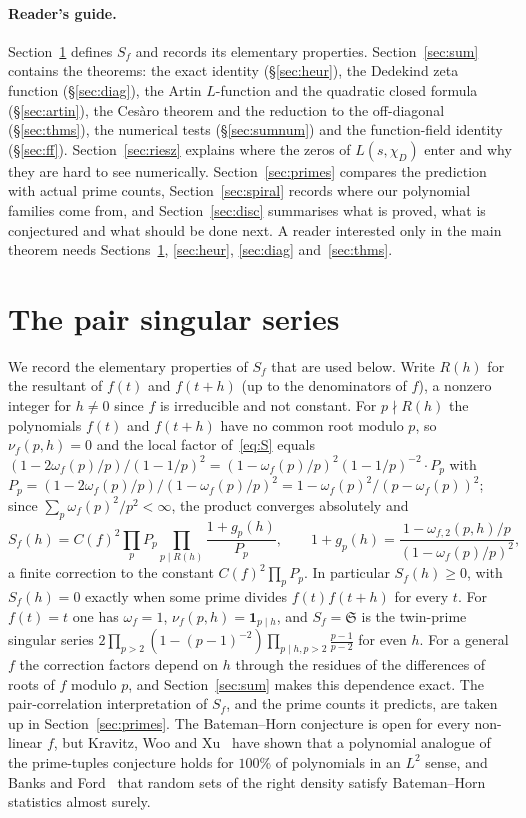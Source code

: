 \documentclass[11pt,a4paper]{article}
\theoremstyle{remark}\newtheorem{remark}[theorem]{Remark}
\newcommand{\Sig}{\mathfrak S}
\begin{document}
\paragraph{Reader's guide.} Section~\ref{sec:pair} defines $S_f$ and records its elementary properties.
Section~\ref{sec:sum} contains the theorems: the exact identity (\S\ref{sec:heur}), the Dedekind zeta
function (\S\ref{sec:diag}), the Artin $L$-function and the quadratic closed formula (\S\ref{sec:artin}),
the Ces\`aro theorem and the reduction to the off-diagonal (\S\ref{sec:thms}), the numerical tests
(\S\ref{sec:sumnum}) and the function-field identity (\S\ref{sec:ff}). Section~\ref{sec:riesz} explains where
the zeros of $L(s,\chi_D)$ enter and why they are hard to see numerically. Section~\ref{sec:primes}
compares the prediction with actual prime counts, Section~\ref{sec:spiral} records where our polynomial
families come from, and Section~\ref{sec:disc} summarises what is proved, what is conjectured and what
should be done next. A reader interested only in the main theorem needs Sections~\ref{sec:pair},
\ref{sec:heur}, \ref{sec:diag} and~\ref{sec:thms}.

\section{The pair singular series}\label{sec:pair}

We record the elementary properties of $S_f$ that are used below. Write $R(h)$ for the resultant of $f(t)$
and $f(t+h)$ (up to the denominators of $f$), a nonzero integer for $h\ne0$ since $f$ is irreducible and
not constant. For $p\nmid R(h)$ the polynomials $f(t)$ and $f(t+h)$ have no common root modulo $p$, so
$\nu_f(p,h)=0$ and the local factor of~\eqref{eq:S} equals $(1-2\omega_f(p)/p)/(1-1/p)^2=(1-\omega_f(p)/p)^2(1-1/p)^{-2}\cdot P_p$
with $P_p=(1-2\omega_f(p)/p)/(1-\omega_f(p)/p)^2=1-\omega_f(p)^2/(p-\omega_f(p))^2$; since
$\sum_p\omega_f(p)^2/p^2<\infty$, the product converges absolutely and
\[
S_f(h)=C(f)^2\prod_pP_p\prod_{p\mid R(h)}\frac{1+g_p(h)}{P_p},\qquad
1+g_p(h)=\frac{1-\omega_{f,2}(p,h)/p}{(1-\omega_f(p)/p)^2},
\]
a finite correction to the constant $C(f)^2\prod_pP_p$. In particular $S_f(h)\ge0$, with $S_f(h)=0$
exactly when some prime divides $f(t)f(t+h)$ for every $t$. For $f(t)=t$ one has $\omega_f=1$,
$\nu_f(p,h)=\mathbf 1_{p\mid h}$, and $S_f=\Sig$ is the twin-prime singular series
$2\prod_{p>2}(1-(p-1)^{-2})\prod_{p\mid h,p>2}\frac{p-1}{p-2}$ for even $h$. For a general $f$ the
correction factors depend on $h$ through the residues of the differences of roots of $f$ modulo $p$, and
Section~\ref{sec:sum} makes this dependence exact. The pair-correlation interpretation of $S_f$, and the
prime counts it predicts, are taken up in Section~\ref{sec:primes}. The Bateman--Horn conjecture is
open for every non-linear $f$, but Kravitz, Woo and Xu~\cite{KravitzWooXu2025} have shown that a
polynomial analogue of the prime-tuples conjecture holds for $100\%$ of polynomials in an $L^2$ sense,
and Banks and Ford~\cite{BanksFord2026} that random sets of the right density satisfy Bateman--Horn
statistics almost surely.
\end{document}
